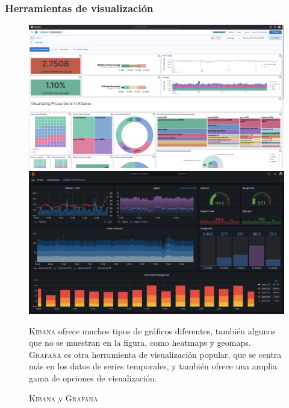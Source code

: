 \subsubsection{Herramientas de visualización}
\begin{figure}[htbp]
   \centering
   \includegraphics[width=0.49\columnwidth]{images/06/kibana.png}
   \includegraphics[width=0.49\columnwidth]{images/06/grafana.png}
   \caption{\textsc{Kibana} y \textsc{Grafana}}
   \label{fig:06/kibana}

   \textsc{Kibana} ofrece muchos tipos de gráficos diferentes, también algunos que no se muestran en la figura, como heatmaps y geomaps. \textsc{Grafana} es otra herramienta de visualización popular, que se centra más en los datos de series temporales, y también ofrece una amplia gama de opciones de visualización. 
\end{figure}

